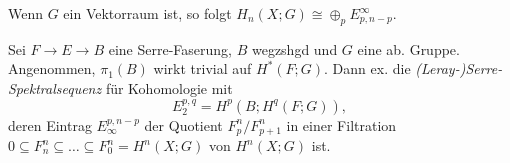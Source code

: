 \documentclass{cheat-sheet}
\begin{document}
\begin{bem}
  Wenn $G$ ein Vektorraum ist, so folgt $H_n(X; G) \cong \oplus_p E^\infty_{p,n-p}$.
\end{bem}

\begin{thm}
  Sei $F \to E \to B$ eine Serre-Faserung, $B$ wegzshgd und $G$ eine ab. Gruppe. Angenommen, $\pi_1(B)$ wirkt trivial auf $H^*(F; G)$.
  Dann ex. die \emph{(Leray-)Serre-Spektralsequenz} für Kohomologie mit
  \[ E_2^{p,q} = H^p(B; H^q(F; G)), \]
  deren Eintrag $E_\infty^{p,n-p}$ der Quotient $F_p^n/F_{p+1}^n$ in einer Filtration
  $0 \subseteq F_n^n \subseteq \ldots \subseteq F_0^n = H^n(X; G)$ von $H^n(X; G)$ ist.
\end{thm}


\end{document}
